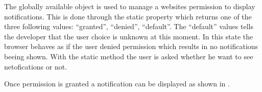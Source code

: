 The globally available  object is used to manage a websites permission to display notifications. This is done through the static  property which returns one of the three following values: \enquote{granted}, \enquote{denied}, \enquote{default}. The \enquote{default} values tells the developer that the user choice is unknown at this moment. In this state the browser behaves as if the user denied permission which results in no notifications beeing shown. With the static  method the user is asked whether he want to see netofications or not.


Once permission is granted a notification can be displayed as shown in .



